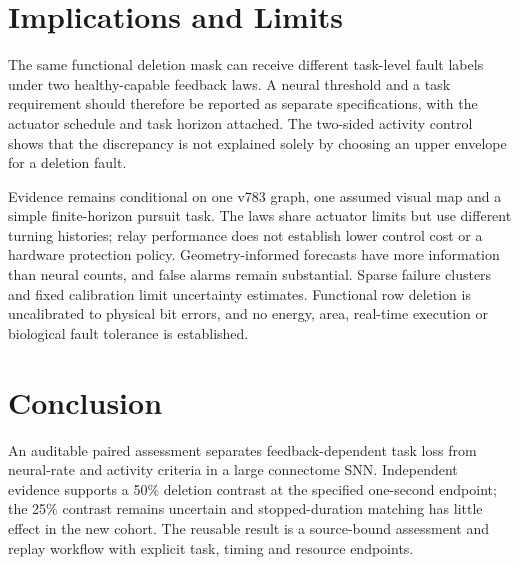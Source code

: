 \section{Implications and Limits}
The same functional deletion mask can receive different task-level fault labels under two healthy-capable feedback laws. A neural threshold and a task requirement should therefore be reported as separate specifications, with the actuator schedule and task horizon attached. The two-sided activity control shows that the discrepancy is not explained solely by choosing an upper envelope for a deletion fault.

Evidence remains conditional on one v783 graph, one assumed visual map and a simple finite-horizon pursuit task. The laws share actuator limits but use different turning histories; relay performance does not establish lower control cost or a hardware protection policy. Geometry-informed forecasts have more information than neural counts, and false alarms remain substantial. Sparse failure clusters and fixed calibration limit uncertainty estimates. Functional row deletion is uncalibrated to physical bit errors, and no energy, area, real-time execution or biological fault tolerance is established.

\section{Conclusion}
An auditable paired assessment separates feedback-dependent task loss from neural-rate and activity criteria in a large connectome SNN. Independent evidence supports a 50\% deletion contrast at the specified one-second endpoint; the 25\% contrast remains uncertain and stopped-duration matching has little effect in the new cohort. The reusable result is a source-bound assessment and replay workflow with explicit task, timing and resource endpoints.
